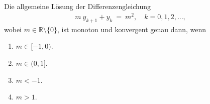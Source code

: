 \subsection*{}
Die allgemeine Lösung der Differenzengleichung
\begin{align*}
m \ y_{k+1} + y_k  \ = \ m^2, \quad k=0,1,2,...,
\end{align*}
wobei $m \in \mathbb{R} \setminus \lbrace 0 \rbrace$, ist monoton und konvergent genau dann, wenn
\renewcommand{\labelenumi}{(\alph{enumi})}
\begin{enumerate}
\item 
$m \in [-1,0)$.
\item
$m \in (0,1]$.
\item
$m < -1$.
\item
$m> 1$.
\end{enumerate}
